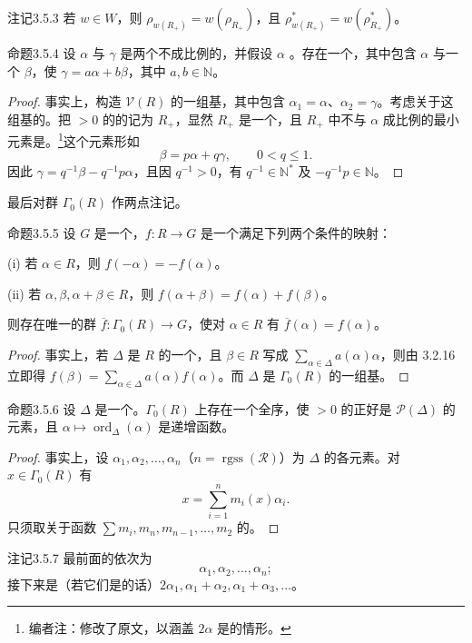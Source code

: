 \begin{SGAresult}{注记}{3.5.3}
若 $w\in W$，则 $\rho_{w(R_+)}=w(\rho_{R_+})$，且 $\rho^*_{w(R_+)}=w(\rho^*_{R_+})$。
\end{SGAresult}
\begin{SGAresult}{命题}{3.5.4}
设 $\alpha$ 与 $\gamma$ 是两个不成比例的，并假设 $\alpha$ 。存在一个，其中包含 $\alpha$ 与一个 $\beta$，使 $\gamma=a\alpha+b\beta$，其中 $a,b\in\mathbb N$。
\end{SGAresult}
\begin{proof}
事实上，构造 $\mathscr V(R)$ 的一组基，其中包含 $\alpha_1=\alpha$、$\alpha_2=\gamma$。考虑关于这组基的。把 $>0$ 的的记为 $R_+$，显然 $R_+$ 是一个，且 $R_+$ 中不与 $\alpha$ 成比例的最小元素是。\footnote{编者注：修改了原文，以涵盖 $2\alpha$ 是的情形。}这个元素形如
\[\beta=p\alpha+q\gamma,\qquad0<q\leq1.\]
因此 $\gamma=q^{-1}\beta-q^{-1}p\alpha$，且因 $q^{-1}>0$，有 $q^{-1}\in\mathbb N^*$ 及 $-q^{-1}p\in\mathbb N$。
\end{proof}
最后对群 $\Gamma_0(R)$ 作两点注记。
\begin{SGAresult}{命题}{3.5.5}
设 $G$ 是一个，$f:R\to G$ 是一个满足下列两个条件的映射：

(i) 若 $\alpha\in R$，则 $f(-\alpha)=-f(\alpha)$。

(ii) 若 $\alpha,\beta,\alpha+\beta\in R$，则 $f(\alpha+\beta)=f(\alpha)+f(\beta)$。

则存在唯一的群 $\overline f:\Gamma_0(R)\to G$，使对 $\alpha\in R$ 有 $\overline f(\alpha)=f(\alpha)$。
\end{SGAresult}
\begin{proof}
事实上，若 $\Delta$ 是 $R$ 的一个，且 $\beta\in R$ 写成 $\sum_{\alpha\in\Delta}a(\alpha)\alpha$，则由 3.2.16 立即得 $f(\beta)=\sum_{\alpha\in\Delta}a(\alpha)f(\alpha)$。而 $\Delta$ 是 $\Gamma_0(R)$ 的一组基。
\end{proof}
\begin{SGAresult}{命题}{3.5.6}
设 $\Delta$ 是一个。$\Gamma_0(R)$ 上存在一个全序，使 $>0$ 的正好是 $\mathscr P(\Delta)$ 的元素，且 $\alpha\mapsto\operatorname{ord}_\Delta(\alpha)$ 是递增函数。
\end{SGAresult}
\begin{proof}
事实上，设 $\alpha_1,\alpha_2,\ldots,\alpha_n$（$n=\operatorname{rgss}(\mathscr R)$）为 $\Delta$ 的各元素。对 $x\in\Gamma_0(R)$ 有
\[x=\sum_{i=1}^nm_i(x)\alpha_i.\]
只须取关于函数 $\sum m_i,m_n,m_{n-1},\ldots,m_2$ 的。
\end{proof}
\begin{SGAresult}{注记}{3.5.7}
最前面的依次为
\[\alpha_1,\alpha_2,\ldots,\alpha_n;\]
接下来是（若它们是的话）$2\alpha_1,\alpha_1+\alpha_2,\alpha_1+\alpha_3,\ldots$。
\end{SGAresult}

